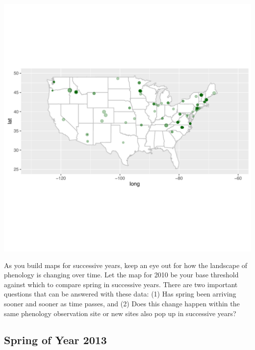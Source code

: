 \documentclass[11pt,twosided]{article}
\begin{document}
\begin{center}
\includegraphics[width=6.5in]{pheno2010}
\end{center}

As you build maps for successive years, keep an eye out for how the landscape of phenology is changing over time.  Let the map for 2010 be your base threshold against which to compare spring in successive years.  There are two important questions that can be answered with these data: (1) Has spring been arriving sooner and sooner as time passes, and (2) Does this change happen within the same phenology observation site or new sites also pop up in successive years?


\subsection{Spring of Year 2013}

\begin{tcolorbox}[breakable,boxrule=0.5pt,enhanced]
\end{tcolorbox}
\vspace{1ex}
\end{document}

